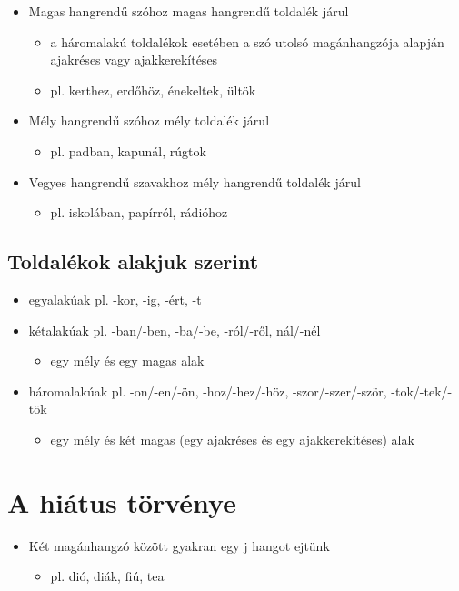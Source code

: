 \documentclass{article}
\begin{document}
\begin{itemize}
    \item Magas hangrendű szóhoz magas hangrendű toldalék járul \begin{itemize}
        \item a háromalakú toldalékok esetében a szó utolsó magánhangzója alapján ajakréses vagy ajakkerekítéses
        \item pl. kerthez, erdőhöz, énekeltek, ültök
    \end{itemize}
    \item Mély hangrendű szóhoz mély toldalék járul \begin{itemize}
        \item pl. padban, kapunál, rúgtok
    \end{itemize}
    \item Vegyes hangrendű szavakhoz mély hangrendű toldalék járul \begin{itemize}
        \item pl. iskolában, papírról, rádióhoz
    \end{itemize}
\end{itemize}

\subsection{Toldalékok alakjuk szerint}
\begin{itemize}
    \item egyalakúak pl. -kor, -ig, -ért, -t
    \item kétalakúak pl. -ban/-ben, -ba/-be, -ról/-ről, nál/-nél \begin{itemize}
        \item egy mély és egy magas alak
    \end{itemize}
    \item háromalakúak pl. -on/-en/-ön, -hoz/-hez/-höz, -szor/-szer/-ször, -tok/-tek/-tök \begin{itemize}
        \item egy mély és két magas (egy ajakréses és egy ajakkerekítéses) alak
    \end{itemize}
\end{itemize}

\section{A hiátus törvénye}
\begin{itemize}
    \item Két magánhangzó között gyakran egy j hangot ejtünk \begin{itemize}
        \item pl. dió, diák, fiú, tea
    \end{itemize}
\end{itemize}
\end{document}
